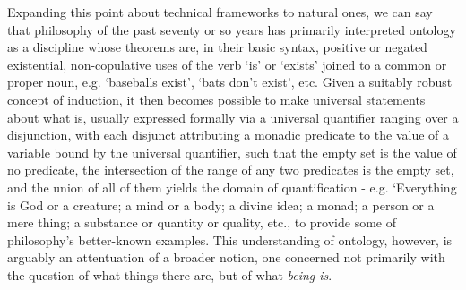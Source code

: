 \documentclass[]{article}
\begin{document}
Expanding this point about technical frameworks to natural ones,
we can say that 
philosophy of the past seventy or so years has primarily interpreted ontology 
as a discipline whose theorems are, 
in their basic syntax, 
positive or negated existential, non-copulative uses of the verb `is' or `exists' joined to a common or proper noun, 
e.g. `baseballs exist', `bats don't exist', etc.
Given a suitably robust concept of induction, it then becomes possible to make universal statements about what is, 
usually expressed formally via a universal quantifier ranging over a disjunction, 
with each disjunct
attributing a monadic predicate to the value of a variable bound by the universal
quantifier, 
such that the empty set is the value of no predicate, 
the intersection of the range of any two predicates is the empty set, 
and the union of all of them
yields the domain of quantification - 
e.g. `Everything is God or a creature; a mind or a body; a divine idea; a monad; a person or a mere thing; a substance or quantity or quality, etc., to provide some of philosophy's better-known examples. 
This understanding of ontology, 
however, 
is arguably 
an attentuation of a broader notion,
one concerned not primarily with the question of what things there are, but of what \emph{being is}. 
\end{document}
